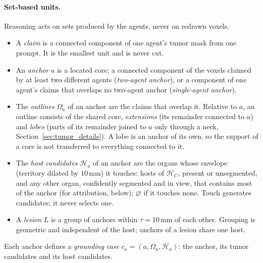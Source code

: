 \documentclass[fleqn,10pt]{olplainarticle}
\begin{document}
\paragraph{Set-based units.}
Reasoning acts on sets produced by the agents, never on redrawn voxels.
\begin{itemize}
\item A \emph{claim} is a connected component of one agent's tumor mask from one prompt. It is the smallest unit and is
never cut.
\item An \emph{anchor} $a$ is a located core: a connected component of the voxels claimed by at least two different
agents (\emph{two-agent anchor}), or a component of one agent's claims that overlaps no two-agent anchor
(\emph{single-agent anchor}).
\item The \emph{outlines} $\Omega_a$ of an anchor are the claims that overlap it. Relative to $a$, an outline consists of
the shared core, \emph{extensions} (its remainder connected to $a$) and \emph{lobes} (parts of its remainder joined to
$a$ only through a neck, Section~\ref{sec:tumor_details}). A lobe is an anchor of its own, so the support of a core is not
transferred to everything connected to it.
\item The \emph{host candidates} $\mathcal{H}_a$ of an anchor are the organs whose envelope (territory dilated by
$10$\,mm) it touches: hosts of $\mathcal{H}_C$, present or unsegmented, and any other organ, confidently segmented and in view,
that contains most of the anchor (for attribution, below); $\varnothing$ if it touches none. Touch generates candidates; it never selects one.
\item A \emph{lesion} $L$ is a group of anchors within $\tau=10$\,mm of each other. Grouping is geometric and independent
of the host; anchors of a lesion share one host.
\end{itemize}
Each anchor defines a \emph{grounding case} $c_a=(a,\Omega_a,\mathcal{H}_a)$: the anchor, its tumor candidates and its
host candidates.
\end{document}
